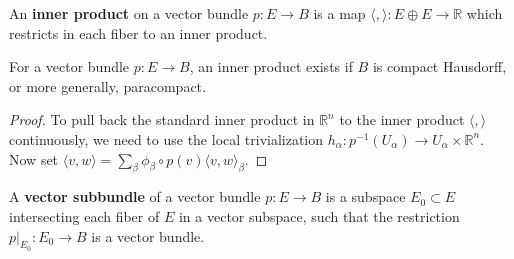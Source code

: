 \begin{defn} An \textbf{inner product} on a vector bundle $p:E\rightarrow B$ is a map $\langle ,\rangle:E\oplus E\rightarrow \mathbb{R}$ which restricts in each fiber to an inner product.
\end{defn}

\begin{prop} For a vector bundle $p:E\rightarrow B$, an inner product exists if $B$ is compact Hausdorff, or more generally, paracompact.
\end{prop}
\begin{proof}
To pull back the standard inner product in $\mathbb{R}^n$ to the inner product $\langle,\rangle$ continuously, we need to use the local trivialization $h_\alpha:p^{-1}(U_\alpha)\rightarrow U_\alpha\times \mathbb{R}^n$. Now set $\langle v,w\rangle=\sum_\beta \phi_\beta\circ p(v) \langle v,w\rangle_{\beta}$.
\end{proof}

\begin{defn} A \textbf{vector subbundle} of a vector bundle $p:E\rightarrow B$ is a subspace $E_0\subset E$ intersecting each fiber of $E$ in a vector subspace, such that the restriction $p|_{E_0}:E_0\rightarrow B$ is a vector bundle. 
\end{defn}

